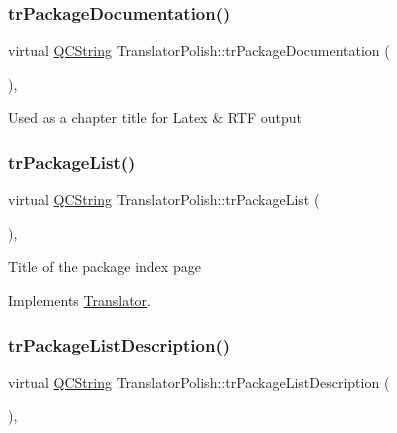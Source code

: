 \subsubsection{\texorpdfstring{trPackageDocumentation()}{trPackageDocumentation()}}
{\footnotesize\ttfamily virtual \mbox{\hyperlink{class_q_c_string}{Q\+C\+String}} Translator\+Polish\+::tr\+Package\+Documentation (\begin{DoxyParamCaption}{ }\end{DoxyParamCaption})\hspace{0.3cm}{\ttfamily [inline]}, {\ttfamily [virtual]}}

Used as a chapter title for Latex \& R\+TF output \mbox{\label{class_translator_polish_a73e66fde6e101c7206ad85184ae8550b}} 
\subsubsection{\texorpdfstring{trPackageList()}{trPackageList()}}
{\footnotesize\ttfamily virtual \mbox{\hyperlink{class_q_c_string}{Q\+C\+String}} Translator\+Polish\+::tr\+Package\+List (\begin{DoxyParamCaption}{ }\end{DoxyParamCaption})\hspace{0.3cm}{\ttfamily [inline]}, {\ttfamily [virtual]}}

Title of the package index page 

Implements \mbox{\hyperlink{class_translator}{Translator}}.

\mbox{\label{class_translator_polish_afbbf97c720f6ffabd1beeebb00ec2433}} 
\subsubsection{\texorpdfstring{trPackageListDescription()}{trPackageListDescription()}}
{\footnotesize\ttfamily virtual \mbox{\hyperlink{class_q_c_string}{Q\+C\+String}} Translator\+Polish\+::tr\+Package\+List\+Description (\begin{DoxyParamCaption}{ }\end{DoxyParamCaption})\hspace{0.3cm}{\ttfamily [inline]}, {\ttfamily [virtual]}}

